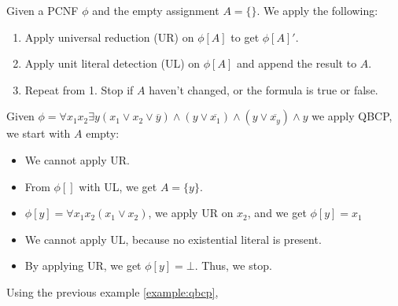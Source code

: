 \begin{definition}
    Given a PCNF $\phi$ and the empty assignment $A = \{\}$. We apply the following:
    \begin{enumerate}
        \item Apply universal reduction (UR) on $\phi[A]$ to get $\phi[A]'$.
        \item Apply unit literal detection (UL) on $\phi[A]$ and append the result to $A$.
        \item Repeat from 1. Stop if $A$ haven't changed, or the formula is true or false.
    \end{enumerate}
\end{definition}

\begin{example}\label{example:qbcp}
    Given $\phi = \forall x_1 x_2 \exists y (x_1 \lor x_2 \lor \overline{y}) \land (y \lor \overline{x_1}) \land (y \lor \overline{x_y}) \land y$ we apply QBCP, we start with $A$ empty:
    \begin{itemize}
        \item We cannot apply UR.
        \item From $\phi[]$ with UL, we get $A = \{ y \}$.
        \item $\phi[y] = \forall x_1 x_2 (x_1 \lor x_2)$, we apply UR on $x_2$, and we get $\phi[y] = x_1$
        \item We cannot apply UL, because no existential literal is present.
        \item By applying UR, we get $\phi[y] = \bot$. Thus, we stop.
    \end{itemize}
\end{example}

Using the previous example \ref{example:qbcp}, 

